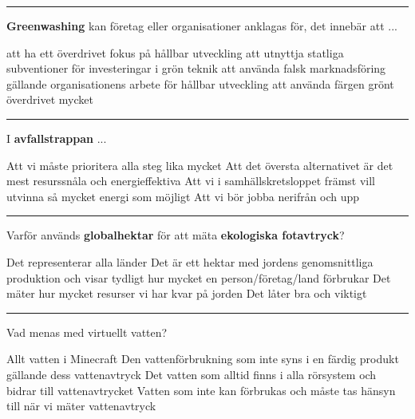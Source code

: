 \documentclass{exam}
\begin{document}
\begin{questions}
\vspace{5mm} \hrule \vspace{5mm}

\question \textbf{Greenwashing} kan företag eller organisationer anklagas för, det innebär att ...
\begin{checkboxes}
    \choice att ha ett överdrivet fokus på hållbar utveckling
    \choice att utnyttja statliga subventioner för investeringar i grön teknik
    \CorrectChoice att använda falsk marknadsföring gällande organisationens arbete för hållbar utveckling
    \choice att använda färgen grönt överdrivet mycket
\end{checkboxes}

\vspace{5mm} \hrule \vspace{5mm}

\question I \textbf{avfallstrappan} ...
\begin{checkboxes}
    \choice Att vi måste prioritera alla steg lika mycket
    \CorrectChoice Att det översta alternativet är det mest resurssnåla och energieffektiva
    \choice Att vi i samhällskretsloppet främst vill utvinna så mycket energi som möjligt
    \choice Att vi bör jobba nerifrån och upp
\end{checkboxes}

\vspace{5mm} \hrule \vspace{5mm}

\question Varför används \textbf{globalhektar} för att mäta \textbf{ekologiska fotavtryck}?
\begin{checkboxes}
    \choice Det representerar alla länder
    \CorrectChoice Det är ett hektar med jordens genomsnittliga produktion och visar tydligt hur mycket en person/företag/land förbrukar
    \choice Det mäter hur mycket resurser vi har kvar på jorden
    \choice Det låter bra och viktigt
\end{checkboxes}

\vspace{5mm} \hrule \vspace{5mm}

\question Vad menas med virtuellt vatten?
\begin{checkboxes}
    \choice Allt vatten i Minecraft
    \CorrectChoice Den vattenförbrukning som inte syns i en färdig produkt gällande dess vattenavtryck
    \choice Det vatten som alltid finns i alla rörsystem och bidrar till vattenavtrycket
    \choice Vatten som inte kan förbrukas och måste tas hänsyn till när vi mäter vattenavtryck
\end{checkboxes}


\end{questions}
\end{document}
